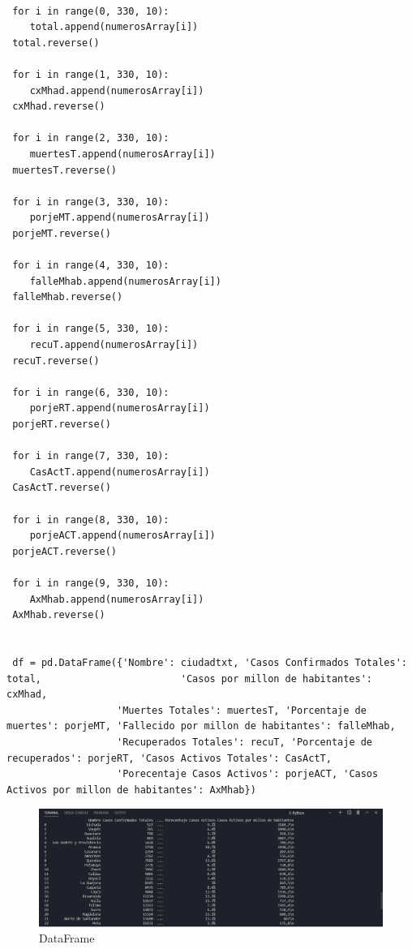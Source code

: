 \documentclass[conference,compsoc,onecolumn]{IEEEtran}
\begin{document}
\lstset{language=Python, breaklines=true, basicstyle=\footnotesize}
\lstset{numbers=left, numberstyle=\tiny, stepnumber=1, numbersep=-2pt}
\begin{lstlisting}[frame=single,caption={Código división de información y DataFrame },captionpos=b]

 for i in range(0, 330, 10):
    total.append(numerosArray[i])
 total.reverse()

 for i in range(1, 330, 10):
    cxMhad.append(numerosArray[i])
 cxMhad.reverse()

 for i in range(2, 330, 10):
    muertesT.append(numerosArray[i])
 muertesT.reverse()

 for i in range(3, 330, 10):
    porjeMT.append(numerosArray[i])
 porjeMT.reverse()

 for i in range(4, 330, 10):
    falleMhab.append(numerosArray[i])
 falleMhab.reverse()

 for i in range(5, 330, 10):
    recuT.append(numerosArray[i])
 recuT.reverse()

 for i in range(6, 330, 10):
    porjeRT.append(numerosArray[i])
 porjeRT.reverse()

 for i in range(7, 330, 10):
    CasActT.append(numerosArray[i])
 CasActT.reverse()

 for i in range(8, 330, 10):
    porjeACT.append(numerosArray[i])
 porjeACT.reverse()

 for i in range(9, 330, 10):
    AxMhab.append(numerosArray[i])
 AxMhab.reverse()


 df = pd.DataFrame({'Nombre': ciudadtxt, 'Casos Confirmados Totales': total,                        'Casos por millon de habitantes': cxMhad,
                   'Muertes Totales': muertesT, 'Porcentaje de muertes': porjeMT, 'Fallecido por millon de habitantes': falleMhab,
                   'Recuperados Totales': recuT, 'Porcentaje de recuperados': porjeRT, 'Casos Activos Totales': CasActT,
                   'Porecentaje Casos Activos': porjeACT, 'Casos Activos por millon de habitantes': AxMhab})

\end{lstlisting}
\label{cod}

\begin{figure}[H]
    \centering
    \includegraphics[keepaspectratio , scale = 0.3]{dataframe.jpg}
    \caption{DataFrame}\label{GraficoTorta}
\end{figure}
\end{document}
